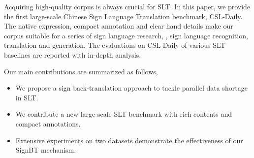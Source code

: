 \documentclass[final]{cvpr}
\begin{document}
Acquiring high-quality corpus is always crucial for SLT. In this paper, we provide the first large-scale Chinese Sign Language Translation benchmark, CSL-Daily. 
The native expression, compact annotation and clear hand details make our corpus suitable for a series of sign language research, 
\eg, sign language recognition, translation and generation. 
The evaluations on CSL-Daily of various SLT baselines are reported with in-depth analysis. 

Our main contributions are summarized as follows,
\begin{itemize}[itemsep=1pt,topsep=1pt,parsep=1pt,partopsep=0pt]
   \item We propose a sign back-translation approach to tackle parallel data shortage in SLT. 
   \item We contribute a new large-scale SLT benchmark with rich contents and compact annotations. 
   \item Extensive experiments on two datasets demonstrate the effectiveness of our SignBT mechanism. 
\end{itemize}
\end{document}
